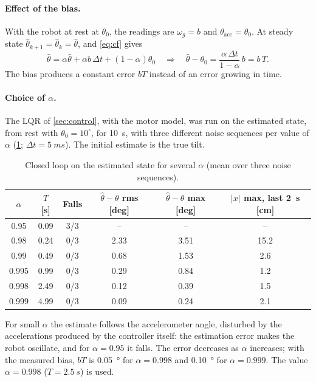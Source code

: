 \paragraph{Effect of the bias.} With the robot at rest at $\theta_0$, the
readings are $\omega_g = b$ and $\theta_{\mathrm{acc}} = \theta_0$. At steady
state $\hat\theta_{k+1} = \hat\theta_k = \hat\theta$, and \cref{eq:cf} gives
\begin{equation}
  \hat\theta = \alpha\hat\theta + \alpha b\,\Delta t + (1 - \alpha)\theta_0
  \quad\Rightarrow\quad
  \hat\theta - \theta_0 = \frac{\alpha\,\Delta t}{1 - \alpha}\,b = b\,T .
\end{equation}
The bias produces a constant error $bT$ instead of an error growing in time.

\paragraph{Choice of $\alpha$.} The LQR of \cref{sec:control}, with the motor
model, was run on the estimated state, from rest with $\theta_0 = 10^\circ$, for
\SI{10}{s}, with three different noise sequences per value of $\alpha$
(\cref{tab:alpha}; $\Delta t = \SI{5}{ms}$). The initial estimate is the true
tilt.

\begin{table}[h]
\centering
\caption{Closed loop on the estimated state for several $\alpha$ (mean over
three noise sequences).}
\label{tab:alpha}
\begin{tabular}{@{}cccccc@{}}
\toprule
$\alpha$ & $T$ [s] & Falls & $\hat\theta - \theta$ rms [deg] & $\hat\theta - \theta$ max [deg] & $|x|$ max, last \SI{2}{s} [cm] \\
\midrule
0.95  & 0.09 & 3/3 & --   & --   & --   \\
0.98  & 0.24 & 0/3 & 2.33 & 3.51 & 15.2 \\
0.99  & 0.49 & 0/3 & 0.68 & 1.53 & 2.6  \\
0.995 & 0.99 & 0/3 & 0.29 & 0.84 & 1.2  \\
0.998 & 2.49 & 0/3 & 0.12 & 0.39 & 1.5  \\
0.999 & 4.99 & 0/3 & 0.09 & 0.24 & 2.1  \\
\bottomrule
\end{tabular}
\end{table}

For small $\alpha$ the estimate follows the accelerometer angle, disturbed by
the accelerations produced by the controller itself: the estimation error
makes the robot oscillate, and for $\alpha = 0.95$ it falls. The error decreases
as $\alpha$ increases; with the measured bias, $bT$ is \SI{0.05}{\degree} for
$\alpha = 0.998$ and \SI{0.10}{\degree} for $\alpha = 0.999$. The value
$\alpha = 0.998$ ($T = \SI{2.5}{s}$) is used.

